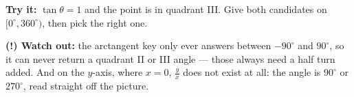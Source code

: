 \documentclass[12pt]{article}
\begin{document}
\begin{tryitbox}
\textbf{Try it:} $\tan\theta = 1$ and the point is in quadrant III. Give both
candidates on $[0^\circ, 360^\circ)$, then pick the right one.\\[2pt]
\end{tryitbox}

\begin{watchoutbox}
\textbf{(!) Watch out:} the arctangent key only ever answers between
$-90^\circ$ and $90^\circ$, so it can never return a quadrant II or III angle
--- those always need a half turn added. And on the $y$-axis, where $x = 0$,
$\frac{y}{x}$ does not exist at all: the angle is $90^\circ$ or $270^\circ$,
read straight off the picture.
\end{watchoutbox}
\end{document}
